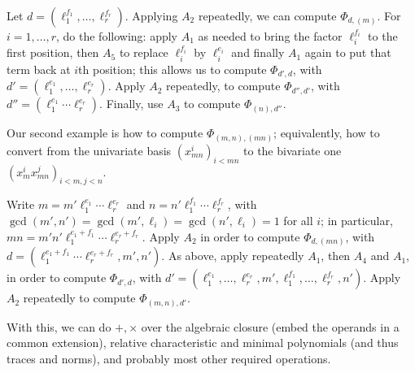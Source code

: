 \documentclass{sig-alternate}
\begin{document}
Let $d=(\ell_1^{f_1},\dots,\ell_r^{f_r})$. Applying $A_2$ repeatedly,
we can compute $\Phi_{d,(m)}$. For $i=1,\dots,r$, do the following:
apply $A_1$ as needed to bring the factor $\ell_i^{f_i}$ to the first
position, then $A_5$ to replace $\ell_i^{f_i}$ by $\ell_i^{e_i}$ and
finally $A_1$ again to put that term back at $i$th position; this
allows us to compute $\Phi_{d',d}$, with
$d'=(\ell_1^{e_1},\dots,\ell_r^{e_r})$.  Apply $A_2$ repeatedly, to
compute $\Phi_{d'',d'}$, with $d''=(\ell_1^{e_1}\cdots\ell_r^{e_r})$.
Finally, use $A_3$ to compute $\Phi_{(n),d''}$.

Our second example is how to compute $\Phi_{(m,n), (mn)}$;
equivalently, how to convert from the univariate basis $(x_{mn}^i)_{i
  < mn}$ to the bivariate one $(x_m^i x_{mn}^j)_{i < m, j < n}$.

Write $m = m' \ell_1^{e_1}\cdots \ell_r^{e_r}$ and $n = n'
\ell_1^{f_1}\cdots \ell_r^{f_r}$, with
$\gcd(m',n')=\gcd(m',\ell_i)=\gcd(n',\ell_i)=1$ for all $i$; in
particular, $mn = m' n' \ell_1^{e_1+f_1}\cdots \ell_r^{e_r+f_r}$.
Apply $A_2$ in order to compute $\Phi_{d,(mn)}$, with $d =
(\ell_1^{e_1+f_1}\cdots\ell_r^{e_r+f_r}, m', n')$. As above, apply
repeatedly $A_1$, then $A_4$ and $A_1$, in order to compute
$\Phi_{d',d}$, with $d'=(\ell_1^{e_1},\dots, \ell_r^{e_r},
m',\ell_1^{f_1},\dots,\ell_r^{f_r}, n')$. Apply $A_2$ repeatedly
to compute $\Phi_{(m,n),d'}$.

With this, we can do $+,\times$ over the algebraic closure (embed the
operands in a common extension), relative characteristic and minimal
polynomials (and thus traces and norms), and probably most other
required operations.


\scriptsize
 
\end{document}
